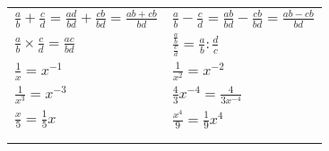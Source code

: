 \documentclass[../main.tex]{subfiles}
\begin{document}
\begin{tabularx}{1\textwidth} { 
    >{\centering\arraybackslash}X 
    >{\centering\arraybackslash}X  }
    \begin{math}
        \frac{a}{b} + \frac{c}{d} = \frac{ad}{bd} + \frac{cb}{bd} = \frac{ab+cb}{bd}
    \end{math}
    &
    \begin{math}
        \frac{a}{b} - \frac{c}{d} = \frac{ab}{bd} - \frac{cb}{bd} = \frac{ab-cb}{bd}
    \end{math}
    \\ [7pt]
    \begin{math}
        \frac{a}{b} \times \frac{c}{d} = \frac{ac}{bd}
    \end{math}
    &
    \begin{math}
       \frac{\frac{a}{b}}{\frac{c}{d}} = \frac{a}{b} : \frac{d}{c}
    \end{math}
    \\ [7pt]
    \begin{math}
        \frac{1}{x} = x^{-1}
    \end{math}
    &
    \begin{math}
        \frac{1}{x^2} = x^{-2}
    \end{math}
    \\ [7pt]
    \begin{math}
        \frac{1}{x^3} = x^{-3}
    \end{math}
    &
    \begin{math}
        \frac{4}{3}x^{-4} = \frac{4}{3x^{-4}}
    \end{math}
    \\ [7pt]
    \begin{math}
        \frac{x}{5} = \frac{1}{5}x
    \end{math}
    &
    \begin{math}
        \frac{x^4}{9} = \frac{1}{9}x^4
    \end{math}
    \\ [7pt]
    \begin{math}
        {}
    \end{math}
    &
    \begin{math}
        {}
    \end{math}
    \\ [7pt]
    \begin{math}
        {}
    \end{math}
    &
    \begin{math}
        {}
    \end{math}
    \\ [7pt]
\end{tabularx}
\end{document}
